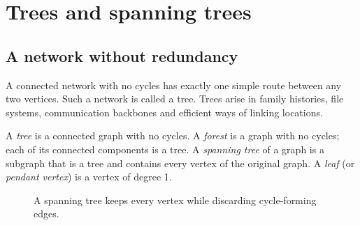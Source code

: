\chapter{Trees and spanning trees}
\section*{A network without redundancy}
A connected network with no cycles has exactly one simple route between any two vertices. Such a network is called a tree. Trees arise in family histories, file systems, communication backbones and efficient ways of linking locations.

\begin{definition}
A \emph{tree} is a connected graph with no cycles. A \emph{forest} is a graph with no cycles; each of its connected components is a tree. A \emph{spanning tree} of a graph is a subgraph that is a tree and contains every vertex of the original graph. A \emph{leaf} (or \emph{pendant vertex}) is a vertex of degree 1.
\end{definition}

\begin{figure}[htbp]
\centering
{}
\caption{A spanning tree keeps every vertex while discarding cycle-forming edges.}
\end{figure}

